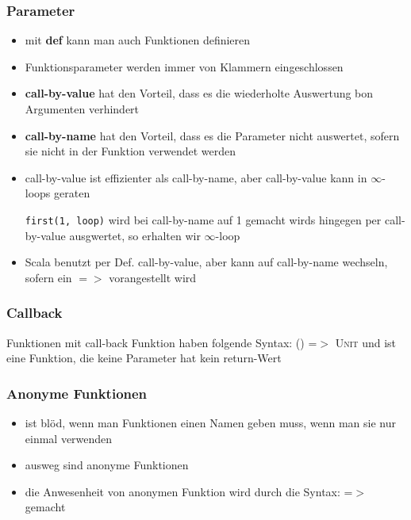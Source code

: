\subsubsection{Parameter}
\begin{itemize}
  \item mit \textbf{def} kann man auch Funktionen definieren
  
  
  
  \item Funktionsparameter werden immer von Klammern eingeschlossen
  \item \textbf{call-by-value} hat den Vorteil, dass es die wiederholte
  Auswertung bon Argumenten verhindert
  \item \textbf{call-by-name} hat den Vorteil, dass es die Parameter
  nicht auswertet, sofern sie nicht in der Funktion verwendet werden
  \item call-by-value ist effizienter als call-by-name, aber call-by-value
  kann in $\infty$-loops geraten
  
  
  
  \texttt{first(1, loop)} wird bei call-by-name auf 1 gemacht \und wirds
  hingegen per call-by-value ausgwertet, so erhalten wir $\infty$-loop
  \item Scala benutzt per Def. call-by-value, aber kann auf call-by-name
  wechseln, sofern ein $=>$ vorangestellt wird
  
  
  
\end{itemize}


\subsubsection{Callback}
Funktionen mit call-back Funktion haben folgende Syntax: 
  \textsc{() =$>$ Unit} und ist eine Funktion, die keine Parameter hat \und 
  kein return-Wert
  
  


\subsubsection{Anonyme Funktionen}
\begin{itemize}
  \item ist blöd, wenn man Funktionen einen Namen geben muss, wenn man sie
  nur einmal verwenden
  \item ausweg sind anonyme Funktionen
  \item die Anwesenheit von anonymen Funktion wird durch die Syntax:
  \textsc{=$>$} gemacht
  
  
\end{itemize}


